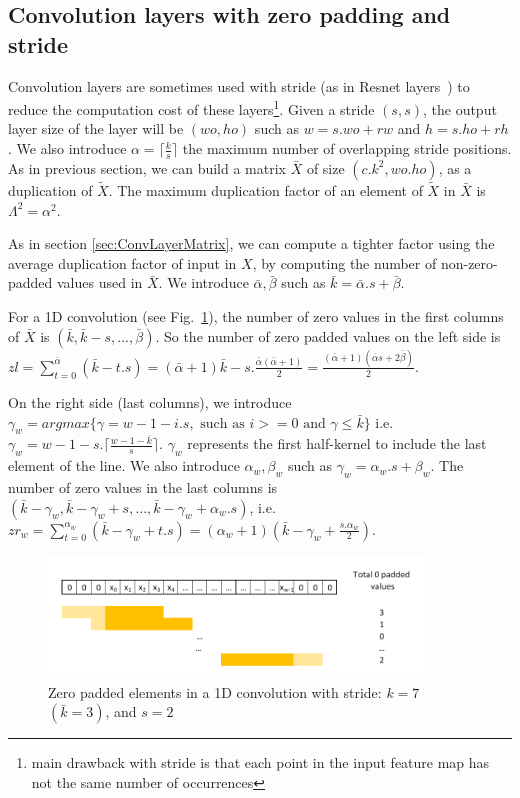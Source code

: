   

\subsection{Convolution layers with zero padding and stride }
\label{sec:convStride}
Convolution layers are sometimes used with stride (as in Resnet layers~\cite{he_deep_2015}) to reduce the computation cost of these layers\footnote{main drawback with stride is that each point in the input feature map has not the same number of occurrences}. Given a stride $(s,s)$, the output layer size of the layer will be $(wo,ho)$ such as $w=s.wo+rw$ and $h=s.ho+rh$. We also introduce $\alpha=\lceil \frac{k}{s} \rceil$ the maximum number of overlapping stride positions.
As in previous section, we can build a matrix $\bar{X}$ of size $(c.k^2,wo.ho)$, as a duplication of  $\widetilde{X}$. The maximum duplication factor of an element of $\widetilde{X}$ in  $\bar{X}$ is $\Lambda^2=\alpha^2$.

As in section \ref{sec:ConvLayerMatrix}, we can compute a tighter factor using the average duplication factor of input in $X$, by computing the number of non-zero-padded values used in $\bar{X}$. We introduce $\bar{\alpha},\bar{\beta}$ such as $\bar{k}=\bar{\alpha}.s+\bar{\beta}$.

For a 1D convolution  (see Fig.~\ref{fig:conv1DWithStride}), the number of zero values in the first columns of $\bar{X}$ is $(\bar{k},\bar{k}-s,...,\bar{\beta})$. So the number of zero padded values on the left side is $zl=\sum_{t=0}^{\bar{\alpha}}(\bar{k}-t.s)=(\bar{\alpha}+1)\bar{k}-s.\frac{\bar{\alpha}(\bar{\alpha}+1)}{2}=\frac{(\bar{\alpha}+1)(\bar{\alpha}s+2\bar{\beta})}{2}$.

On the right side (last columns), we introduce 
$\gamma_w = argmax\{\gamma=w-1-i.s,  \text{ such as } i>=0  \text{ and }\gamma\leq \bar{k}\}$ i.e. $\gamma_w = w-1-s.\lceil{\frac{w-1-\bar{k}}{s}} \rceil$.  $\gamma_w$ represents the first half-kernel to include the last element of the line. We also introduce $\alpha_w,\beta_w$ such as $\gamma_w = \alpha_w.s+\beta_w$. The number of zero values in the last columns is $(\bar{k}-\gamma_w,\bar{k}-\gamma_w+s,...,\bar{k}-\gamma_w+\alpha_w.s)$, i.e.  $zr_w=\sum_{t=0}^{\alpha_w}(\bar{k}-\gamma_w+t.s)=(\alpha_w+1)(\bar{k}-\gamma_w+\frac{s.\alpha_w}{2})$.
\begin{figure}[htp]
    \centering
    \includegraphics[width=10cm]{img/Conv1D_padding_stride}
    \caption{Zero padded elements in a 1D convolution with stride: $k=7$  $(\bar{k} = 3)$, and $s=2$}
    \label{fig:conv1DWithStride}
\end{figure}

